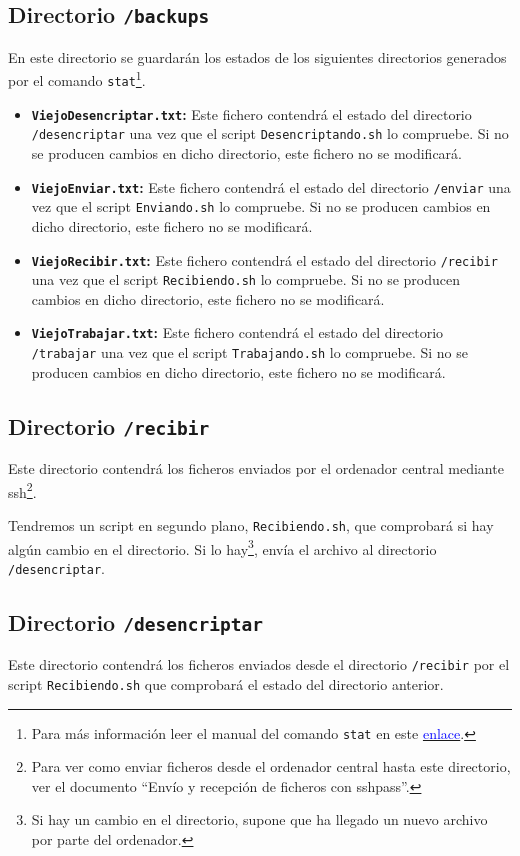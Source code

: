 \documentclass[12pt,letterpaper]{article}
\begin{document}
\subsection{Directorio \texttt{/backups}}
En este directorio se guardarán los estados de los siguientes directorios generados por el comando \texttt{stat}\footnote{Para más información leer el manual del comando \texttt{stat} en este \href{https://linux.die.net/man/2/stat}{\textcolor{blue}{enlace}}.}.
\begin{itemize}
	\item \textbf{\texttt{ViejoDesencriptar.txt}:} Este fichero contendrá el estado del directorio \texttt{/desencriptar} una vez que el script \texttt{Desencriptando.sh} lo compruebe. Si no se producen cambios en dicho directorio, este fichero no se modificará.
	\item \textbf{\texttt{ViejoEnviar.txt}:} Este fichero contendrá el estado del directorio \texttt{/enviar} una vez que el script \texttt{Enviando.sh} lo compruebe. Si no se producen cambios en dicho directorio, este fichero no se modificará.
	\item \textbf{\texttt{ViejoRecibir.txt}:} Este fichero contendrá el estado del directorio \texttt{/recibir} una vez que el script \texttt{Recibiendo.sh} lo compruebe. Si no se producen cambios en dicho directorio, este fichero no se modificará.
	\item \textbf{\texttt{ViejoTrabajar.txt}:} Este fichero contendrá el estado del directorio \texttt{/trabajar} una vez que el script \texttt{Trabajando.sh} lo compruebe. Si no se producen cambios en dicho directorio, este fichero no se modificará.
\end{itemize}

\subsection{Directorio \texttt{/recibir}}
Este directorio contendrá los ficheros enviados por el ordenador central mediante ssh\footnote{Para ver como enviar ficheros desde el ordenador central hasta este directorio, ver el documento ``Envío y recepción de ficheros con sshpass''.}.

Tendremos un script en segundo plano, \texttt{Recibiendo.sh}, que comprobará si hay algún cambio en el directorio. Si lo hay\footnote{Si hay un cambio en el directorio, supone que ha llegado un nuevo archivo por parte del ordenador.}, envía el archivo al directorio \texttt{/desencriptar}.

\subsection{Directorio \texttt{/desencriptar}}
Este directorio contendrá los ficheros enviados desde el directorio \texttt{/recibir} por el script \texttt{Recibiendo.sh} que comprobará el estado del directorio anterior.
\end{document}

